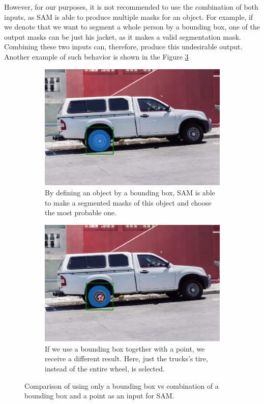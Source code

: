 However, for our purposes, it is not recommended
to use the combination of both inputs, as SAM is able to produce multiple masks for an object. For example, if we
denote that we want to segment a whole person by a bounding box, one of the output masks can be just his jacket, as it
makes a
valid segmentation mask. Combining these two inputs can, therefore, produce this undesirable output. Another
example of
such
behavior
is shown in the Figure \ref{fig:sam_examples}
\begin{figure}[htbp]
  \centering
  \begin{subfigure}[h]{0.48\textwidth}
    \centering
    \includegraphics[width=\textwidth]{text/chapter_04/imgs/SAM_box}
    \caption{By defining an object by a bounding box, SAM is able to make a segmented masks of this object and choose
    the most probable one.}
    \label{fig:sam_box}
  \end{subfigure}
  \hfill
  \begin{subfigure}[h]{0.48\textwidth}
    \centering
    \includegraphics[width=\textwidth]{text/chapter_04/imgs/SAM_box_point}
    \caption{If we use a bounding box together with a point, we receive a different result. Here, just the trucks's
    tire, instead of the entire wheel, is selected.}
    \label{fig:sam_boxPoint}
  \end{subfigure}
  \caption{Comparison of using only a bounding box vs combination of a bounding box and a point as an input for SAM.}
  \label{fig:sam_examples}
\end{figure}

